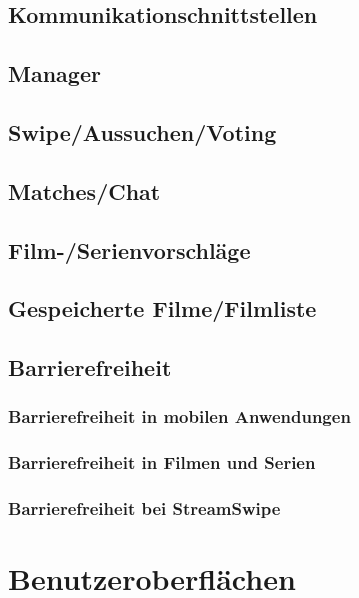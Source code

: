\documentclass[11pt,a4paper]{article}
\begin{document}
\subsection{Kommunikationschnittstellen}
	
\subsection{Manager}	

\subsection{Swipe/Aussuchen/Voting}		
\subsection{Matches/Chat}		
\subsection{Film-/Serienvorschläge}
\subsection{Gespeicherte Filme/Filmliste}		
\subsection{Barrierefreiheit}
\label{sec:barrierefreiheit}

\subsubsection{Barrierefreiheit in mobilen Anwendungen}

\subsubsection{Barrierefreiheit in Filmen und Serien}

\subsubsection{Barrierefreiheit bei StreamSwipe}
\label{sec:bf-streamswipe}

\clearpage

\clearpage
\section{Benutzeroberflächen}
\label{sec:UI-allgemein}

\end{document}
